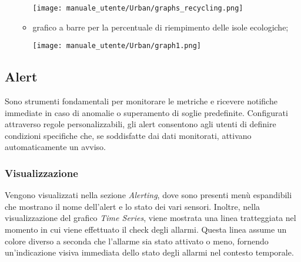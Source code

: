 \begin{itemize}
\begin{itemize}
\begin{center}
            \texttt{[image: manuale\_utente/Urban/graphs\_recycling.png]}
        \end{center}
        \item grafico a barre per la percentuale di riempimento delle isole ecologiche;
        \begin{center}
            \texttt{[image: manuale\_utente/Urban/graph1.png]}
        \end{center}
    \end{itemize}
\end{itemize}



\subsection{Alert}
Sono strumenti fondamentali per monitorare le metriche e ricevere notifiche immediate in caso di anomalie o superamento di soglie predefinite. Configurati attraverso regole personalizzabili, gli alert consentono agli utenti di definire condizioni specifiche che, se soddisfatte dai dati monitorati, attivano automaticamente un avviso.
\subsubsection{Visualizzazione}
Vengono visualizzati nella sezione \textit{Alerting}, dove sono presenti menù espandibili che mostrano il nome dell'alert e lo stato dei vari sensori. Inoltre, nella visualizzazione del grafico \textit{Time Series}, viene mostrata una linea tratteggiata nel momento in cui viene effettuato il check degli allarmi. Questa linea assume un colore diverso a seconda che l'allarme sia stato attivato o meno, fornendo un'indicazione visiva immediata dello stato degli allarmi nel contesto temporale.


